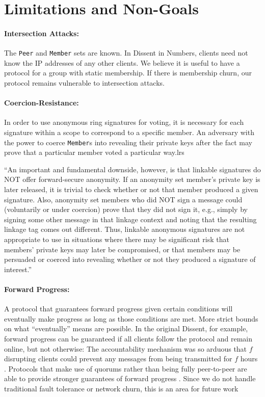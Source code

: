 \section{Limitations and Non-Goals}
  \paragraph{Intersection Attacks:} The \texttt{Peer} and \texttt{Member} sets
  are known. In Dissent in Numbers, clients need not know the IP addresses of
  any other clients. We believe it is useful to have a protocol for a group with
  static membership.  If there is membership churn, our protocol remains
  vulnerable to intersection attacks.
  \paragraph{Coercion-Resistance:} In order to use anonymous ring signatures for
  voting, it is necessary for each signature within a scope to correspond to a
  specific member. An adversary with the power to coerce \texttt{Member}s into
  revealing their private keys after the fact may prove that a particular member
  voted a particular way\cite{lrs}.lrs

``An important and fundamental downside,
however, is that linkable signatures do NOT offer forward-secure anonymity. If
an anonymity set member's private key is later released, it is trivial to check
whether or not that member produced a given signature. Also, anonymity set
members who did NOT sign a message could (voluntarily or under coercion) prove
that they did not sign it, e.g., simply by signing some other message in that
linkage context and noting that the resulting linkage tag comes out different.
Thus, linkable anonymous signatures are not appropriate to use in situations
where there may be significant risk that members' private keys may later be
compromised, or that members may be persuaded or coerced into revealing whether
or not they produced a signature of interest.''
\cite{golrs}
  \paragraph{Forward Progress:} A protocol that guarantees forward progress
  given certain conditions will eventually make progress as long as those
  conditions are met. More strict bounds on what ``eventually'' means are
  possible. In the original Dissent, for example, forward progress can be
  guaranteed if all clients follow the protocol and remain online, but not
  otherwise: The accountability mechanism was so arduous that $f$ disrupting
  clients could prevent any messages from being transmitted for $f$ hours
  \cite{verdict}. Protocols that make use of quorums
  rather than being fully peer-to-peer are able to provide stronger guarantees
  of forward progress \cite{paxos}. Since we do not handle traditional fault
  tolerance or network churn,  this is an area
  for future work 
